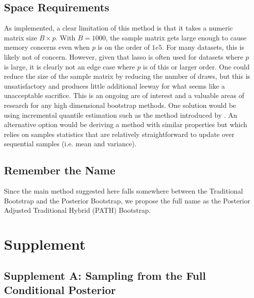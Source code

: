 \subsection{Space Requirements}

As implemented, a clear limitation of this method is that it takes a numeric matrix size $B \times p$. With $B = 1000$, the sample matrix gets large enough to cause memory concerns even when $p$ is on the order of $1e5$. For many datasets, this is likely not of concern. However, given that lasso is often used for datasets where $p$ is large, it is clearly not an edge case where $p$ is of this or larger order. One could reduce the size of the sample matrix by reducing the number of draws, but this is unsatisfactory and produces little additional leeway for what seems like a unacceptable sacrifice. This is an ongoing are of interest and a valuable areas of research for any high dimensional bootstrap methods. One solution would be using incremental quantile estimation such as the method introduced by \cite{Tierney1983}. An alternative option would be deriving a method with similar properties but which relies on samples statistics that are relatively straightforward to update over sequential samples (i.e. mean and variance).

\subsection{Remember the Name}

Since the main method suggested here falls somewhere between the Traditional Bootstrap and the Posterior Bootstrap, we propose the full name as the Posterior Adjusted Traditional Hybrid (PATH) Bootstrap.

\newpage

\section*{Supplement}

\subsection{Supplement A: Sampling from the Full Conditional Posterior}\label{Sup:A}


